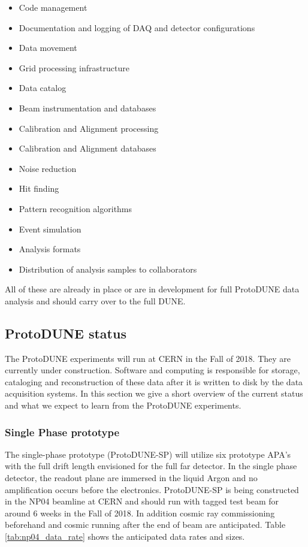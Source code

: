 \begin{itemize}
\item Code management
\item Documentation and logging of DAQ and detector configurations
\item Data movement 
\item Grid processing infrastructure
\item Data catalog
\item Beam instrumentation and databases
\item Calibration and Alignment processing
\item Calibration and Alignment databases
\item Noise reduction
\item Hit finding
\item Pattern recognition algorithms
\item Event simulation
\item Analysis formats
\item Distribution of analysis samples to collaborators
\end{itemize}

All of these  are already in place or are in development for full ProtoDUNE data analysis and should carry over to the full DUNE.

\subsection{ProtoDUNE status}
The ProtoDUNE experiments will run at CERN in the Fall of 2018.  They are currently under construction.  Software and computing is responsible for storage, cataloging and reconstruction of these data after it is written to disk by the data acquisition systems.  In this section we give a short overview of the current status and what we expect to learn from the ProtoDUNE experiments.


\subsubsection{Single Phase prototype}

The single-phase prototype (ProtoDUNE-SP) will utilize six prototype APA's with the full drift length envisioned for the full far detector. In the single phase detector, the readout plane are immersed in the liquid Argon and no amplification occurs before the electronics.    ProtoDUNE-SP is being constructed in the NP04 beamline at CERN and should run with tagged test beam for around 6 weeks in the Fall of 2018.  In addition cosmic ray commissioning beforehand and cosmic running after the end of beam are anticipated.  Table \ref{tab:np04_data_rate}
shows the anticipated data rates and sizes. 



